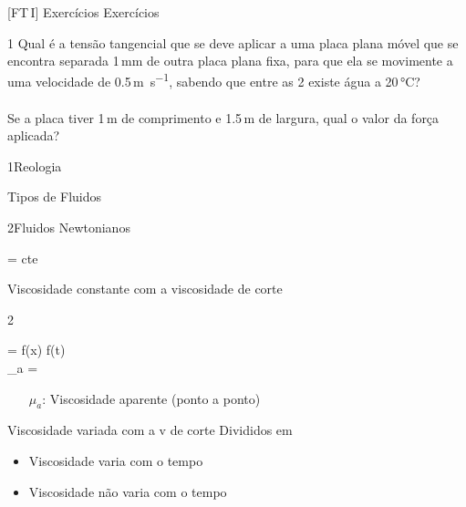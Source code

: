 \documentclass[\mainfilename]{subfiles}
\begin{document}
[FT\,I]
{Exercícios}
{Exercícios}

\setcounter{part}{2}


\begin{questionBox}1{
    Qual é a tensão tangencial que se deve aplicar a uma placa plana móvel que se encontra separada 1\,\si{\milli\metre} de outra placa plana fixa, para que ela se movimente a uma velocidade de 0.5\,\si{\metre\per\second}, sabendo que entre as 2 existe água a 20\,\si{\celsius}?\\\\
    Se a placa tiver 1\,\si{\metre} de comprimento e 1.5\,\si{\metre} de largura, qual o valor da força aplicada?
} %
    
\end{questionBox}

\begin{sectionBox}1{Reologia}
    
    Tipos de Fluidos
    
    \begin{sectionBox}2{Fluidos Newtonianos}
        
        \begin{BM}
             = cte
        \end{BM}

        Viscosidade constante com a viscosidade de corte
        
    \end{sectionBox}

    \begin{sectionBox}2{}

        \begin{BM}
             = f(x) \lor f(t)
            \\
            \mu_a = 
        \end{BM}
        \begin{itemize}
            \item[\(\mu_a\):] Viscosidade aparente (ponto a ponto)
        \end{itemize}
        
        Viscosidade variada com a v de corte
        Divididos em
        \begin{itemize}
            \item Viscosidade varia com o tempo
            \item Viscosidade não varia com o tempo
        \end{itemize}
        
    \end{sectionBox}
    
\end{sectionBox}
\end{document}
